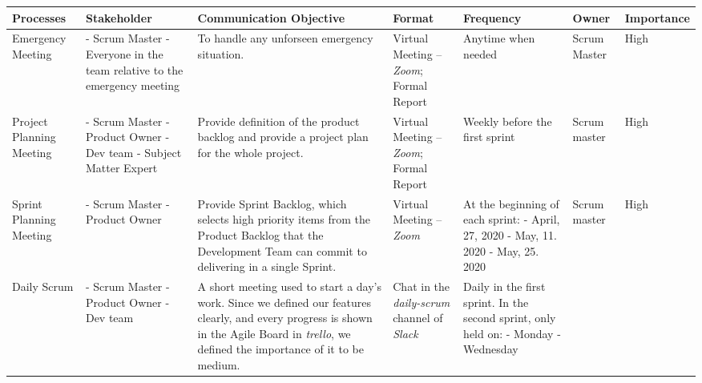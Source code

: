 \documentclass{report}
\begin{document}
\begin{tabularx}{\linewidth}{%
  >{\raggedright\arraybackslash}p{1.5cm}%
  >{\raggedright\arraybackslash}p{2cm}%
  >{\raggedright\arraybackslash}X%
  >{\raggedright\arraybackslash}p{1.5cm}%
  >{\raggedright\arraybackslash}p{2cm}%
  >{\raggedright\arraybackslash}p{1.1cm}%
  >{\raggedright\arraybackslash}l}
  \toprule
  Processes & Stakeholder & Communication Objective & Format & Frequency & Owner & Importance
  \\
  \midrule
  Emergency Meeting
  & - Scrum Master
  \newline - Everyone in the team relative to the emergency meeting
  & To handle any unforseen emergency situation.
  & Virtual Meeting -- \textit{Zoom}; Formal Report
  & Anytime when needed
  & Scrum Master
  & High
  \\
  \midrule
  Project Planning Meeting
  & 
  - Scrum Master
  \newline - Product Owner
  \newline - Dev team
  \newline - Subject Matter Expert
  & Provide definition of the product backlog and provide a project plan for the whole project.
  & Virtual Meeting -- \textit{Zoom}; Formal Report
  & Weekly before the first sprint
  & Scrum master
  & High
  \\
  \midrule
  Sprint Planning Meeting
  & 
  - Scrum Master
  \newline - Product Owner
  & Provide Sprint Backlog, which selects high priority items from the Product Backlog that the Development Team can commit to delivering in a single Sprint.
  & Virtual Meeting -- \textit{Zoom}
  & At the beginning of each sprint:
  \newline - April, 27, 2020
  \newline - May, 11. 2020
  \newline - May, 25. 2020
  & Scrum master
  & High
  \\
  \midrule
  Daily Scrum
  & 
  - Scrum Master
  \newline - Product Owner
  \newline - Dev team
  & A short meeting used to start a day's work. Since we defined our features clearly, and every progress is shown in the Agile Board in \textit{trello}, we defined the importance of it to be medium.
  & Chat in the \textit{daily-scrum} channel of \textit{Slack}
  & Daily in the first sprint. In the second sprint, only held on:
  \newline - Monday
  \newline - Wednesday

\end{tabularx}
\end{document}
